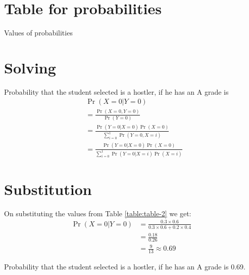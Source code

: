 \documentclass{beamer}
\providecommand{\pr}[1]{\ensuremath{\Pr\left(#1\right)}}
\begin{document}
\section{Table for probabilities}
\begin{frame}{}
    \begin{table}[ht!]
\centering
	
	\vspace*{5pt}
\caption{Values of probabilities}
	\label{table:table-2}
\end{table}

\end{frame}

\section{Solving}
\begin{frame}{}
    Probability that the student selected is a hostler, if he has an A grade is 
\begin{align}
    &\pr{X=0|Y=0} \\ 
	&= \frac{\pr{X = 0,Y = 0}}{\pr{Y = 0}} \\
	&= \frac{\pr{Y = 0|X = 0}\pr{X = 0}}{\sum_{i=0}^1 \pr{Y = 0, X=i}} \\
	&= \frac{\pr{Y = 0|X = 0}\pr{X = 0}}{\sum_{i=0}^1 \pr{Y=0|X=i}\pr{X = i}}
\end{align}
\end{frame}

\section{Substitution}
\begin{frame}{}
    On substituting the values from Table \eqref{table:table-2} we get:
\begin{align}
	\pr{X=0|Y=0} &= \frac{0.3 \times 0.6}{0.3 \times 0.6 + 0.2 \times 0.4}\\
	&= \frac{0.18}{0.26}\\
	&= \frac{9}{13} \approx 0.69
\end{align}

\begin{block}{}
Probability that the student selected is a hostler, if he has an A grade is 0.69.
\end{block}

\end{frame}
\end{document}
